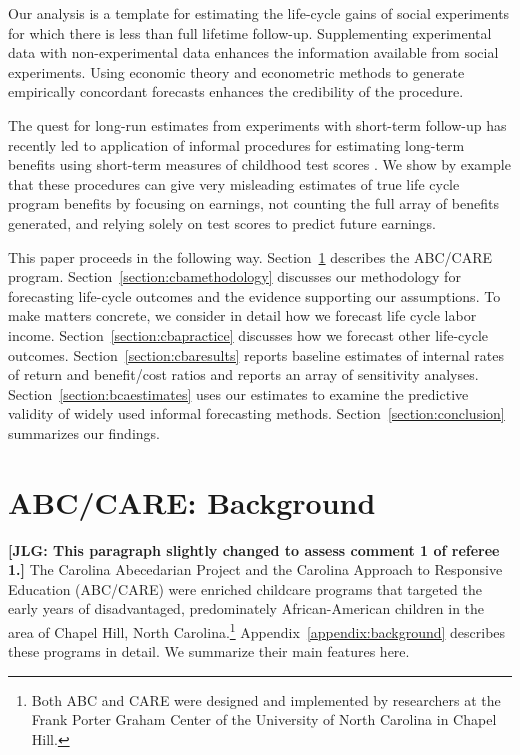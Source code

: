 Our analysis is a template for estimating the life-cycle gains of social experiments for which there is less than full lifetime follow-up. Supplementing experimental data with non-experimental data enhances the information available from social experiments. Using economic theory and econometric methods to generate empirically concordant forecasts enhances the credibility of the procedure.

The quest for long-run estimates from experiments with short-term follow-up has recently led to application of informal procedures for estimating long-term benefits using short-term measures of childhood test scores \citep[e.g.][]{Chetty_Friedman_etal_2011_QJoE,Kline_Walters_2016_QJE}. We show by example that these procedures can give very misleading estimates of true life cycle program benefits by focusing on earnings, not counting the full array of benefits generated, and relying solely on test scores to predict future earnings.

This paper proceeds in the following way. Section~\ref{section:background} describes the ABC/CARE program. Section~\ref{section:cbamethodology} discusses our methodology for forecasting life-cycle outcomes and the evidence supporting our assumptions. To make matters concrete, we consider in detail how we forecast life cycle labor income. Section~\ref{section:cbapractice} discusses how we forecast other life-cycle outcomes. Section~\ref{section:cbaresults} reports baseline estimates of internal rates of return and benefit/cost ratios and reports an array of sensitivity analyses. Section~\ref{section:bcaestimates} uses our estimates to examine the predictive validity of widely used informal forecasting methods. Section~\ref{section:conclusion} summarizes our findings.

\section{ABC/CARE: Background} \label{section:background}

\noindent \textbf{[JLG: This paragraph slightly changed to assess comment 1 of referee 1.]} The Carolina Abecedarian Project and the Carolina Approach to Responsive Education (ABC/CARE) were enriched childcare programs that targeted the early years of disadvantaged, predominately African-American children in the area of Chapel Hill, North Carolina.\footnote{Both ABC and CARE were designed and implemented by researchers at the Frank Porter Graham Center of the University of North Carolina in Chapel Hill.} Appendix~\ref{appendix:background} describes these programs in detail. We summarize their main features here.

